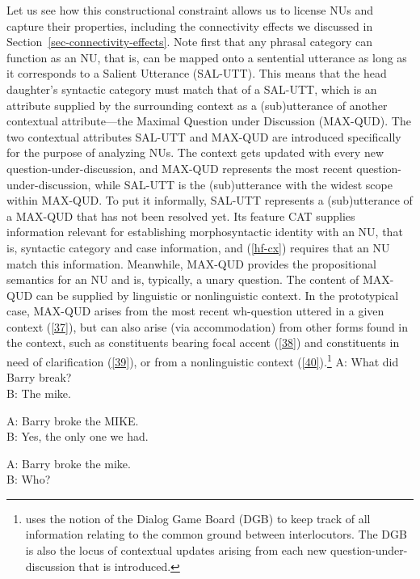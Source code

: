 \documentclass[output=paper
                ,modfonts
                ,nonflat
	        ,collection
	        ,collectionchapter
	        ,collectiontoclongg
 	        ,biblatex
                ,babelshorthands
                ,newtxmath
                ,draftmode
                ,colorlinks, citecolor=brown
]{./langsci/langscibook}
\begin{document}
{%
\z
Let us see how this constructional constraint allows us to
license NUs and capture their properties, including the connectivity effects we discussed in Section~\ref{sec-connectivity-effects}. Note first that any phrasal category
can function as an NU, that is, can be mapped onto a sentential utterance as long as it corresponds to a Salient Utterance (SAL-UTT). This means that
the head daughter's syntactic category must match that of a SAL-UTT, which is an attribute supplied by the surrounding context as a (sub)utterance of another contextual attribute---the Maximal Question under Discussion (MAX-QUD). The two contextual attributes SAL-UTT and MAX-QUD are introduced specifically for the purpose of analyzing NUs. The context gets updated with every new question-under-discussion, and MAX-QUD represents the most recent question-under-discussion, while SAL-UTT is the (sub)utterance with the widest scope within MAX-QUD. To put it informally, SAL-UTT represents a (sub)utterance of a MAX-QUD that has not been resolved yet. Its feature CAT supplies information relevant for establishing morphosyntactic identity with an NU, that is, syntactic category and case information, and (\ref{hf-cx}) requires that an NU match this information. Meanwhile, MAX-QUD provides the propositional semantics for an NU and is, typically, a unary question. The content of MAX-QUD can be supplied by linguistic or nonlinguistic context. In the prototypical case, MAX-QUD arises from the most recent wh-question uttered in a given context (\ref{37}), but can also arise (via accommodation) from other forms found in the context, such as constituents bearing focal accent (\ref{38}) and constituents in need of clarification (\ref{39}), or from a nonlinguistic context (\ref{40}).\footnote{\citet{Ginzburg2012} uses the notion of the Dialog Game Board (DGB) to keep track of all information relating to the common ground between interlocutors. The DGB is also the locus of contextual updates arising from each new question-under-discussion that is introduced.}
\ea 
A: What did Barry break? \\
B: The mike.\label{37}
\z

\ea 
A: Barry broke the MIKE. \\
B: Yes, the only one we had.\label{38}
\z

\ea 
A: Barry broke the mike. \\
B: Who?\label{39}
\z

}
\end{document}
